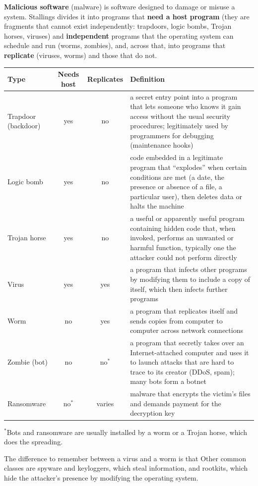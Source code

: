 \textbf{Malicious software} (malware) is software designed to damage or misuse a system. Stallings divides it into programs that \textbf{need a host program} (they are fragments that cannot exist independently: trapdoors, logic bombs, Trojan horses, viruses) and \textbf{independent} programs that the operating system can schedule and run (worms, zombies), and, across that, into programs that \textbf{replicate} (viruses, worms) and those that do not.
\begin{center}\small
\begin{tabularx}{\textwidth}{@{}l c c >{\raggedright\arraybackslash}X@{}}
\toprule
Type & Needs host & Replicates & Definition\\
\midrule
Trapdoor (backdoor) & yes & no & a secret entry point into a program that lets someone who knows it gain access without the usual security procedures; legitimately used by programmers for debugging (maintenance hooks)\\
Logic bomb & yes & no & code embedded in a legitimate program that ``explodes'' when certain conditions are met (a date, the presence or absence of a file, a particular user), then deletes data or halts the machine\\
Trojan horse & yes & no & a useful or apparently useful program containing hidden code that, when invoked, performs an unwanted or harmful function, typically one the attacker could not perform directly\\
Virus & yes & yes & a program that infects other programs by modifying them to include a copy of itself, which then infects further programs\\
Worm & no & yes & a program that replicates itself and sends copies from computer to computer across network connections\\
Zombie (bot) & no & no$^{*}$ & a program that secretly takes over an Internet-attached computer and uses it to launch attacks that are hard to trace to its creator (DDoS, spam); many bots form a botnet\\
Ransomware & no$^{*}$ & varies & malware that encrypts the victim's files and demands payment for the decryption key\\
\bottomrule
\end{tabularx}
\end{center}
{\small $^{*}$Bots and ransomware are usually installed by a worm or a Trojan horse, which does the spreading.}

The difference to remember between a virus and a worm is that  Other common classes are spyware and keyloggers, which steal information, and rootkits, which hide the attacker's presence by modifying the operating system.

